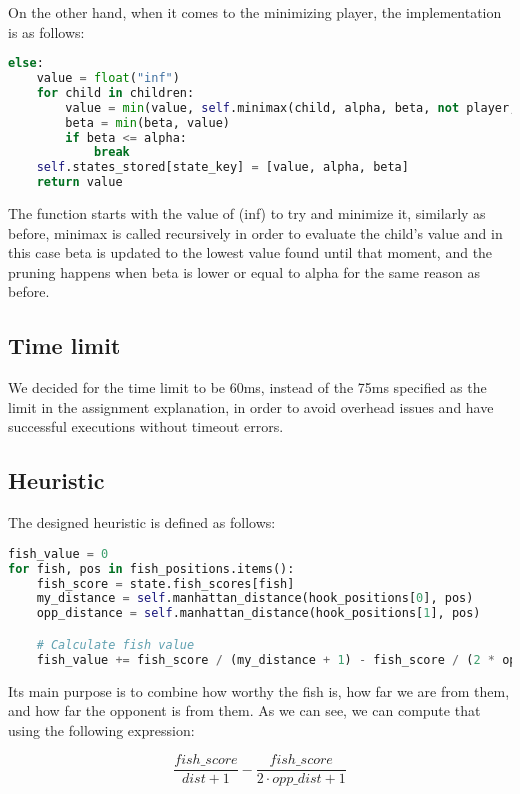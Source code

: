 \documentclass[12pt]{article}
\begin{document}
On the other hand, when it comes to the minimizing player, the implementation is as follows:
\begin{lstlisting}[language=Python, caption=Minimax implementation]
else:
    value = float("inf")
    for child in children:
        value = min(value, self.minimax(child, alpha, beta, not player, max_depth))
        beta = min(beta, value)
        if beta <= alpha:
            break
    self.states_stored[state_key] = [value, alpha, beta]
    return value
\end{lstlisting}

The function starts with the value of (inf) to try and minimize it, similarly as before, minimax is called recursively in order to evaluate the child's value and in this case beta is updated to the lowest value found until that moment, and the pruning happens when beta is lower or equal to alpha for the same reason as before.

\subsection{Time limit}
We decided for the time limit to be 60ms, instead of the 75ms specified as the limit in the assignment explanation, in order to avoid overhead issues and have successful executions without timeout errors.

\subsection{Heuristic}

The designed heuristic is defined as follows:

\begin{lstlisting}[language=Python, caption=Implementation Example]
fish_value = 0
for fish, pos in fish_positions.items():
    fish_score = state.fish_scores[fish]
    my_distance = self.manhattan_distance(hook_positions[0], pos)
    opp_distance = self.manhattan_distance(hook_positions[1], pos)

    # Calculate fish value
    fish_value += fish_score / (my_distance + 1) - fish_score / (2 * opp_distance + 1)
\end{lstlisting}

Its main purpose is to combine how worthy the fish is, how far we are from them, and how far the opponent is from them. As we can see, we can compute that using the following expression:

$$\frac{fish\_score}{dist+1} - \frac{fish\_score}{2\cdot opp\_dist+1}$$
\end{document}
